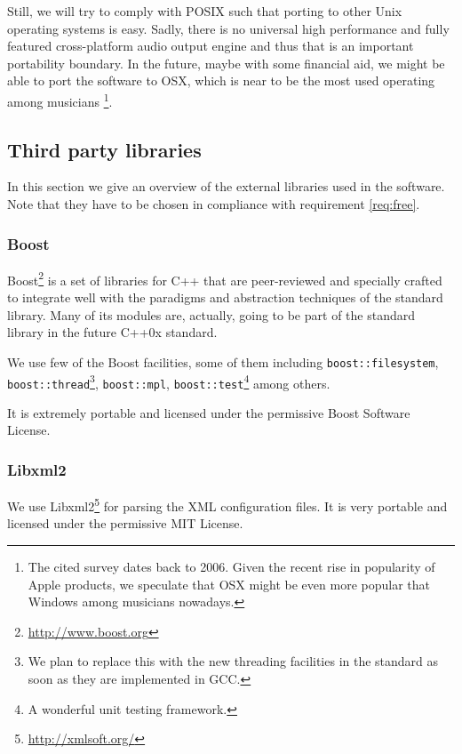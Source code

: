 Still, we will try to comply with POSIX such that porting to other
Unix operating systems is easy. Sadly, there is no universal high
performance and fully featured cross-platform audio output engine and
thus that is an important portability boundary. In the future, maybe
with some financial aid, we might be able to port the software to OSX,
which is near to be the most used operating among
musicians \cite{magnusson07acoustic}\footnote{The cited survey dates
  back to 2006. Given the recent rise in popularity of Apple products,
  we speculate that OSX might be even more popular that Windows among
  musicians nowadays.}.

\subsection{Third party libraries}

In this section we give an overview of the external libraries used in
the software. Note that they have to be chosen in compliance with
requirement \ref{req:free}.

\subsubsection{Boost}

Boost\footnote{\url{http://www.boost.org}} is a set of libraries for
C++ that are peer-reviewed and specially crafted to integrate well
with the paradigms and abstraction techniques of the standard
library. Many of its modules are, actually, going to be part of the
standard library in the future C++0x standard. 

We use few of the Boost facilities, some of them including
\texttt{boost::filesystem}, \texttt{boost::thread}\footnote{We plan to
replace this with the new threading facilities in the standard as soon
as they are implemented in GCC.},
\texttt{boost::mpl}, \texttt{boost::test}\footnote{A wonderful unit
  testing framework.} among others.

It is extremely portable and licensed under the permissive Boost
Software License.

\subsubsection{Libxml2}

We use Libxml2\footnote{\url{http://xmlsoft.org/}} for parsing the XML
configuration files. It is very portable and licensed under the
permissive MIT License.

